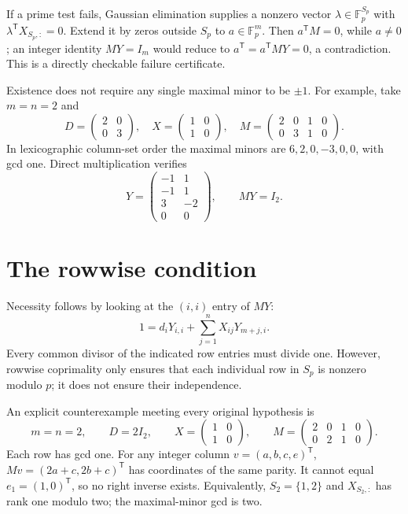 \documentclass[11pt]{article}
\newcommand{\F}{\mathbb F}
\begin{document}
If a prime test fails, Gaussian elimination supplies a nonzero vector
$\lambda\in\F_p^{S_p}$ with
$\lambda^{\mathsf T}X_{S_p,:}=0$. Extend it by zeros outside $S_p$ to
$a\in\F_p^m$. Then $a^{\mathsf T}M=0$, while $a\ne0$; an integer
identity $MY=I_m$ would reduce to
$a^{\mathsf T}=a^{\mathsf T}MY=0$, a contradiction. This is a
directly checkable failure certificate.

Existence does not require any single maximal minor to be $\pm1$.
For example, take $m=n=2$ and
\[
 D=\begin{pmatrix}2&0\\0&3\end{pmatrix},\quad
 X=\begin{pmatrix}1&0\\1&0\end{pmatrix},\quad
 M=\begin{pmatrix}2&0&1&0\\0&3&1&0\end{pmatrix}.
\]
In lexicographic column-set order the maximal minors are
$6,2,0,-3,0,0$, with gcd one. Direct multiplication verifies
\[
 Y=\begin{pmatrix}-1&1\\-1&1\\3&-2\\0&0\end{pmatrix},
 \qquad MY=I_2.
\]

\section{The rowwise condition}
Necessity follows by looking at the $(i,i)$ entry of $MY$:
\[
 1=d_iY_{i,i}+\sum_{j=1}^n X_{ij}Y_{m+j,i}.
\]
Every common divisor of the indicated row entries must divide one.
However, rowwise coprimality only ensures that each individual row
in $S_p$ is nonzero modulo $p$; it does not ensure their independence.

An explicit counterexample meeting every original hypothesis is
\begin{equation}\label{eq:counterexample}
 m=n=2,\qquad D=2I_2,\qquad
 X=\begin{pmatrix}1&0\\1&0\end{pmatrix},\qquad
 M=\begin{pmatrix}2&0&1&0\\0&2&1&0\end{pmatrix}.
\end{equation}
Each row has gcd one. For any integer column
$v=(a,b,c,e)^{\mathsf T}$,
$Mv=(2a+c,2b+c)^{\mathsf T}$ has coordinates of the same parity.
It cannot equal $e_1=(1,0)^{\mathsf T}$, so no right inverse exists.
Equivalently, $S_2=\{1,2\}$ and $X_{S_2,:}$ has rank one modulo two;
the maximal-minor gcd is two.
\end{document}
